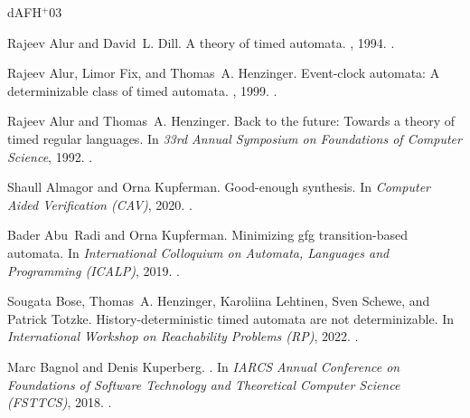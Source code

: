 \documentclass[10pt,a4paper]{amsart}
\theoremstyle{definition}
\numberwithin{equation}{section}
\begin{document}
	
	

\newcommand{\etalchar}[1]{$^{#1}$}
\begin{thebibliography}{dAFH{\etalchar{+}}03}

Rajeev Alur and David~L. Dill.
\newblock A theory of timed automata.
, 1994.
\newblock \href {https://doi.org/10.1016/0304-3975(94)90010-8}
  {}.

Rajeev Alur, Limor Fix, and Thomas~A. Henzinger.
\newblock Event-clock automata: A determinizable class of timed automata.
, 1999.
\newblock \href {https://doi.org/10.1016/S0304-3975(97)00173-4}
  {}.

Rajeev Alur and Thomas~A. Henzinger.
\newblock Back to the future: Towards a theory of timed regular languages.
\newblock In {\em 33rd Annual Symposium on Foundations of Computer Science},
  1992.
\newblock \href {https://doi.org/10.1109/SFCS.1992.267774}
  {}.

Shaull Almagor and Orna Kupferman.
\newblock Good-enough synthesis.
\newblock In {\em Computer Aided Verification (CAV)}, 2020.
\newblock \href {https://doi.org/10.1007/978-3-030-53291-8_28}
  {}.

Bader Abu~Radi and Orna Kupferman.
\newblock Minimizing gfg transition-based automata.
\newblock In {\em International Colloquium on Automata, Languages and
  Programming (ICALP)}, 2019.
\newblock \href {https://doi.org/10.4230/LIPIcs.ICALP.2019.100}
  {}.

\bibitem[BHL{\etalchar{+}}22]{BHLST2022}
Sougata Bose, Thomas~A. Henzinger, Karoliina Lehtinen, Sven Schewe, and Patrick
  Totzke.
\newblock History-deterministic timed automata are not determinizable.
\newblock In {\em International Workshop on Reachability Problems (RP)}, 2022.
\newblock \href {https://doi.org/10.1007/978-3-031-19135-0_5}
  {}.

Marc Bagnol and Denis Kuperberg.
.
\newblock In {\em IARCS Annual Conference on Foundations of Software Technology
  and Theoretical Computer Science (FSTTCS)}, 2018.
\newblock \href {https://doi.org/10.4230/LIPIcs.FSTTCS.2018.16}
  {}.


\end{thebibliography}
\end{document}
